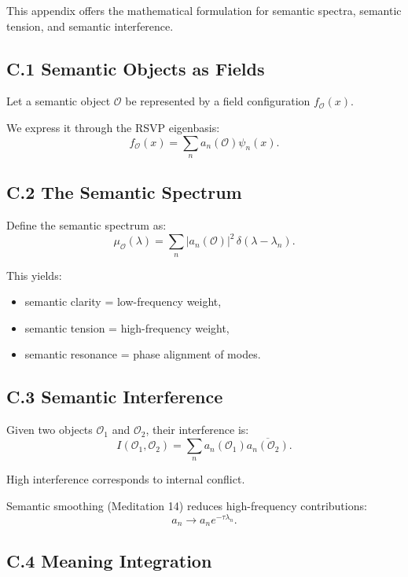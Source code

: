 \documentclass[12pt]{article}
\begin{document}
This appendix offers the mathematical formulation for semantic spectra,
semantic tension, and semantic interference.

\subsection*{C.1 Semantic Objects as Fields}

Let a semantic object $\mathcal{O}$ be represented by a field configuration
$f_{\mathcal{O}}(x)$.

We express it through the RSVP eigenbasis:
\[
f_{\mathcal{O}}(x)
=
\sum_{n} a_n(\mathcal{O}) \psi_n(x).
\]

\subsection*{C.2 The Semantic Spectrum}

Define the semantic spectrum as:
\[
\mu_{\mathcal{O}}(\lambda)
    =
    \sum_{n}
        |a_n(\mathcal{O})|^2 \,
        \delta(\lambda - \lambda_n).
\]

This yields:

\begin{itemize}
\item semantic clarity = low-frequency weight,
\item semantic tension = high-frequency weight,
\item semantic resonance = phase alignment of modes.
\end{itemize}

\subsection*{C.3 Semantic Interference}

Given two objects $\mathcal{O}_1$ and $\mathcal{O}_2$, their interference is:
\[
I(\mathcal{O}_1, \mathcal{O}_2)
=
\sum_n
    a_n(\mathcal{O}_1)
    \overline{a_n(\mathcal{O}_2)}.
\]

High interference corresponds to internal conflict.

Semantic smoothing (Meditation 14) reduces high-frequency contributions:
\[
a_n \to a_n e^{-\tau \lambda_n}.
\]

\subsection*{C.4 Meaning Integration}
\end{document}
